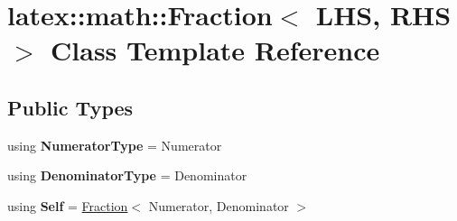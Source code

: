 \hypertarget{classlatex_1_1math_1_1Fraction}{\section{latex\-:\-:math\-:\-:Fraction$<$ L\-H\-S, R\-H\-S $>$ Class Template Reference}
\label{classlatex_1_1math_1_1Fraction}
}
\subsection*{Public Types}
\begin{DoxyCompactItemize}
\item 
\hypertarget{classlatex_1_1math_1_1Fraction_a29f3b8b3550a01e920b5b25f7bc7993a}{using {\bfseries Numerator\-Type} = Numerator}\label{classlatex_1_1math_1_1Fraction_a29f3b8b3550a01e920b5b25f7bc7993a}

\item 
\hypertarget{classlatex_1_1math_1_1Fraction_a208b5f046738fd74662cd57e64092296}{using {\bfseries Denominator\-Type} = Denominator}\label{classlatex_1_1math_1_1Fraction_a208b5f046738fd74662cd57e64092296}

\item 
\hypertarget{classlatex_1_1math_1_1Fraction_a8b39e1eae942078b381addb7b5025d7b}{using {\bfseries Self} = \hyperlink{classlatex_1_1math_1_1Fraction}{Fraction}$<$ Numerator, Denominator $>$}\label{classlatex_1_1math_1_1Fraction_a8b39e1eae942078b381addb7b5025d7b}

\end{DoxyCompactItemize}
